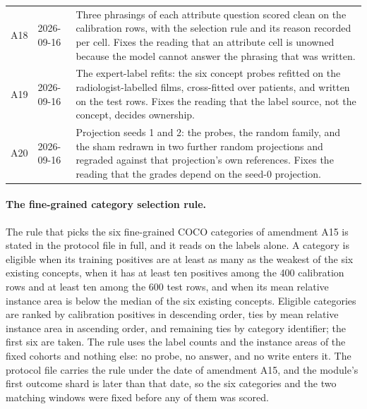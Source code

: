 \begin{table}[h]
\begin{tabular}{ll>{\raggedright\arraybackslash}p{}}
A18 & 2026-09-16 & Three phrasings of each attribute question scored clean on the calibration rows, with the selection rule and its reason recorded per cell. Fixes the reading that an attribute cell is unowned because the model cannot answer the phrasing that was written. \\
A19 & 2026-09-16 & The expert-label refits: the six concept probes refitted on the radiologist-labelled films, cross-fitted over patients, and written on the test rows. Fixes the reading that the label source, not the concept, decides ownership. \\
A20 & 2026-09-16 & Projection seeds 1 and 2: the probes, the random family, and the sham redrawn in two further random projections and regraded against that projection's own references. Fixes the reading that the grades depend on the seed-0 projection. \\
\bottomrule
\end{tabular}
\end{table}

\FloatBarrier

\paragraph{The fine-grained category selection rule.} The rule that picks the six fine-grained COCO categories of amendment A15 is stated in the protocol file in full, and it reads on the labels alone. A category is eligible when its training positives are at least as many as the weakest of the six existing concepts, when it has at least ten positives among the 400 calibration rows and at least ten among the 600 test rows, and when its mean relative instance area is below the median of the six existing concepts. Eligible categories are ranked by calibration positives in descending order, ties by mean relative instance area in ascending order, and remaining ties by category identifier; the first six are taken. The rule uses the label counts and the instance areas of the fixed cohorts and nothing else: no probe, no answer, and no write enters it. The protocol file carries the rule under the date of amendment A15, and the module's first outcome shard is later than that date, so the six categories and the two matching windows were fixed before any of them was scored.
